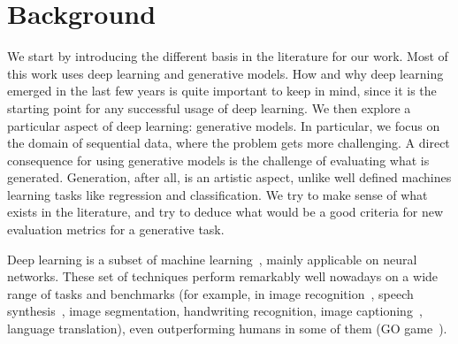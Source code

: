 \clearpage

\section{Background}\label{sec:gbem_background}
\par We start by introducing the different basis in the literature for our work. Most of this work uses deep learning and generative models. How and why deep learning emerged in the last few years is quite important to keep in mind, since it is the starting point for any successful usage of deep learning. We then explore a particular aspect of deep learning: generative models. In particular, we focus on the domain of sequential data, where the problem gets more challenging. A direct consequence for using generative models is the challenge of evaluating what is generated. Generation, after all, is an artistic aspect, unlike well defined machines learning tasks like regression and classification. We try to make sense of what exists in the literature, and try to deduce what would be a good criteria for new evaluation metrics for a generative task.

\par Deep learning is a subset of machine learning~\citep{lecun2015deep,Goodfellow-et-al-2016}, mainly applicable on neural networks. These set of techniques perform remarkably well nowadays on a wide range of tasks and benchmarks (for example, in image recognition~\citep{krizhevsky2012imagenet,simonyan2014very,he2016deep}, speech synthesis~\citep{oord2016wavenet}, image segmentation, handwriting recognition, image captioning~\citep{DBLP:journals/corr/VinyalsTBE14,karpathy2015deep}, language translation\citep{sutskever2014sequence}), even outperforming humans in some of them (GO game~\citep{silver2016mastering}).


